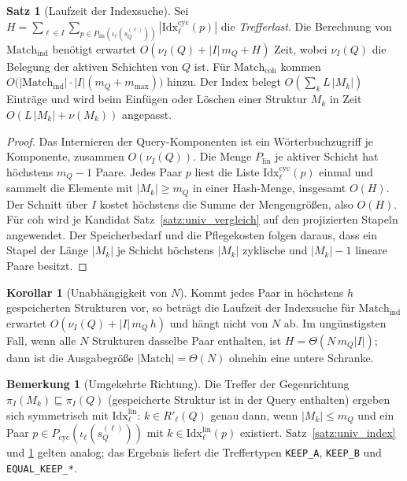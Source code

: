 \documentclass[a4paper,12pt, twoside]{report}
\theoremstyle{definition}
\newtheorem{satz}{Satz}
\newtheorem{bemerkung}{Bemerkung}
\newtheorem{korollar}{Korollar}
\begin{document}
\begin{satz}[Laufzeit der Indexsuche]
	\label{satz:univ_index_zeit}
	Sei $H=\sum_{\ell\in I}\sum_{p\in P_{\mathrm{lin}}(\iota_\ell(s_Q^{(\ell)}))}|\mathrm{Idx}^{\mathrm{cyc}}_\ell(p)|$ die \emph{Trefferlast}. Die Berechnung von $\mathrm{Match}_{\mathrm{ind}}$ benötigt erwartet $O(\nu_I(Q)+|I|\,m_Q+H)$ Zeit, wobei $\nu_I(Q)$ die Belegung der aktiven Schichten von $Q$ ist. Für $\mathrm{Match}_{\mathrm{coh}}$ kommen $O\big(|\mathrm{Match}_{\mathrm{ind}}|\cdot|I|(m_Q+m_{\max})\big)$ hinzu. Der Index belegt $O(\sum_k L\,|M_k|)$ Einträge und wird beim Einfügen oder Löschen einer Struktur $M_k$ in Zeit $O(L\,|M_k|+\nu(M_k))$ angepasst.
\end{satz}

\begin{proof}
	Das Internieren der Query-Komponenten ist ein Wörterbuchzugriff je Komponente, zusammen $O(\nu_I(Q))$. Die Menge $P_{\mathrm{lin}}$ je aktiver Schicht hat höchstens $m_Q-1$ Paare. Jedes Paar $p$ liest die Liste $\mathrm{Idx}^{\mathrm{cyc}}_\ell(p)$ einmal und sammelt die Elemente mit $|M_k|\ge m_Q$ in einer Hash-Menge, insgesamt $O(H)$. Der Schnitt über $I$ kostet höchstens die Summe der Mengengrößen, also $O(H)$. Für coh wird je Kandidat Satz~\ref{satz:univ_vergleich} auf den projizierten Stapeln angewendet. Der Speicherbedarf und die Pflegekosten folgen daraus, dass ein Stapel der Länge $|M_k|$ je Schicht höchstens $|M_k|$ zyklische und $|M_k|-1$ lineare Paare besitzt.
\end{proof}

\begin{korollar}[Unabhängigkeit von $N$]
	\label{kor:univ_unabhaengig}
	Kommt jedes Paar in höchstens $h$ gespeicherten Strukturen vor, so beträgt die Laufzeit der Indexsuche für $\mathrm{Match}_{\mathrm{ind}}$ erwartet $O(\nu_I(Q)+|I|\,m_Q\,h)$ und hängt nicht von $N$ ab. Im ungünstigsten Fall, wenn alle $N$ Strukturen dasselbe Paar enthalten, ist $H=\Theta(N\,m_Q|I|)$; dann ist die Ausgabegröße $|\mathrm{Match}|=\Theta(N)$ ohnehin eine untere Schranke.
\end{korollar}

\begin{bemerkung}[Umgekehrte Richtung]
	Die Treffer der Gegenrichtung $\pi_I(M_k)\sqsubseteq\pi_I(Q)$ (gespeicherte Struktur ist in der Query enthalten) ergeben sich symmetrisch mit $\mathrm{Idx}^{\mathrm{lin}}_\ell$: $k\in R'_\ell(Q)$ genau dann, wenn $|M_k|\le m_Q$ und ein Paar $p\in P_{\mathrm{cyc}}(\iota_\ell(s_Q^{(\ell)}))$ mit $k\in\mathrm{Idx}^{\mathrm{lin}}_\ell(p)$ existiert. Satz~\ref{satz:univ_index} und \ref{satz:univ_index_zeit} gelten analog; das Ergebnis liefert die Treffertypen \texttt{KEEP\_A}, \texttt{KEEP\_B} und \texttt{EQUAL\_KEEP\_*}.
\end{bemerkung}
\end{document}
